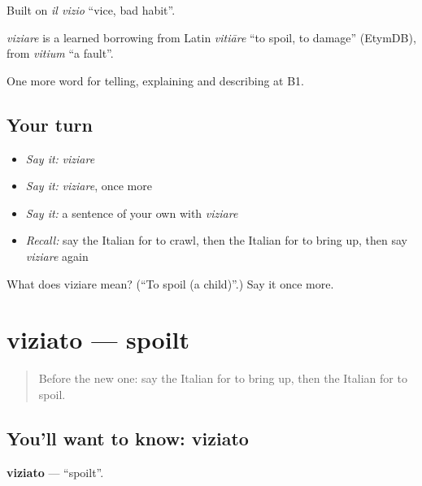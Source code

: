 Built on \emph{il vizio} \textquotedblleft{}vice, bad habit\textquotedblright{}.

\begin{cousinweb}
\emph{viziare} is a learned borrowing from Latin \emph{vitiāre} \textquotedblleft{}to spoil, to damage\textquotedblright{} (EtymDB), from \emph{vitium} \textquotedblleft{}a fault\textquotedblright{}.
\end{cousinweb}

\begin{grammarlens}[title={What you've built}]
One more word for telling, explaining and describing at B1.
\end{grammarlens}

\subsection*{Your turn}
\begin{itemize}
\raggedright
  \item \emph{Say it:} \emph{viziare}
  \item \emph{Say it:} \emph{viziare}, once more
  \item \emph{Say it:} a sentence of your own with \emph{viziare}
  \item \emph{Recall:} say the Italian for to crawl, then the Italian for to bring up, then say \emph{viziare} again
\end{itemize}

\begin{tcolorbox}[breakable,colback=teal!4,colframe=teal!35!black,title={Before you move on}]
What does viziare mean? (\textquotedblleft{}To spoil (a child)\textquotedblright{}.) Say it once more.
\end{tcolorbox}
\section[viziato]{viziato — spoilt}

\label{lesson:IT-C497-viziato}



\begin{quote}
Before the new one: say the Italian for to bring up, then the Italian for to spoil.
\end{quote}

\subsection*{You'll want to know: viziato}
\textbf{viziato} — \textquotedblleft{}spoilt\textquotedblright{}.

